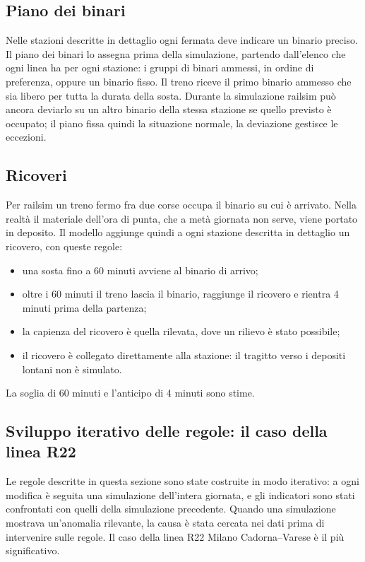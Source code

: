 \subsection{Piano dei binari}
Nelle stazioni descritte in dettaglio ogni fermata deve indicare un binario preciso. Il piano dei binari lo assegna prima della simulazione, partendo dall'elenco che ogni linea ha per ogni stazione: i gruppi di binari ammessi, in ordine di preferenza, oppure un binario fisso. Il treno riceve il primo binario ammesso che sia libero per tutta la durata della sosta. Durante la simulazione railsim può ancora deviarlo su un altro binario della stessa stazione se quello previsto è occupato; il piano fissa quindi la situazione normale, la deviazione gestisce le eccezioni.

\subsection{Ricoveri}
Per railsim un treno fermo fra due corse occupa il binario su cui è arrivato. Nella realtà il materiale dell'ora di punta, che a metà giornata non serve, viene portato in deposito. Il modello aggiunge quindi a ogni stazione descritta in dettaglio un ricovero, con queste regole:
\begin{itemize}
	\item una sosta fino a 60 minuti avviene al binario di arrivo;
	\item oltre i 60 minuti il treno lascia il binario, raggiunge il ricovero e rientra 4 minuti prima della partenza;
	\item la capienza del ricovero è quella rilevata, dove un rilievo è stato possibile;
	\item il ricovero è collegato direttamente alla stazione: il tragitto verso i depositi lontani non è simulato.
\end{itemize}
La soglia di 60 minuti e l'anticipo di 4 minuti sono stime.

\subsection{Sviluppo iterativo delle regole: il caso della linea R22}
Le regole descritte in questa sezione sono state costruite in modo iterativo: a ogni modifica è seguita una simulazione dell'intera giornata, e gli indicatori sono stati confrontati con quelli della simulazione precedente. Quando una simulazione mostrava un'anomalia rilevante, la causa è stata cercata nei dati prima di intervenire sulle regole. Il caso della linea R22 Milano Cadorna--Varese è il più significativo.

